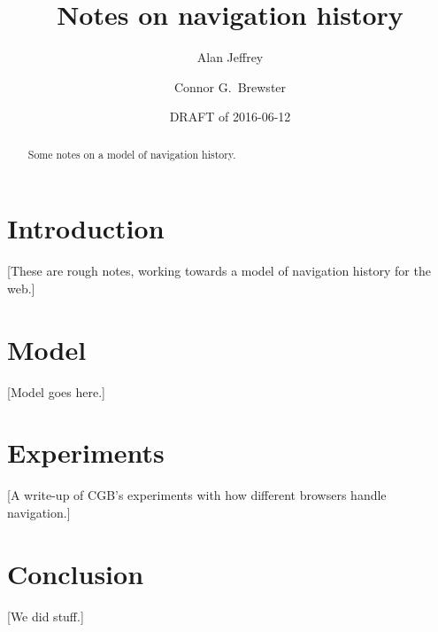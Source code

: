 \documentclass{article}
\title{Notes on navigation history}
\author{%
  Alan Jeffrey
  \and
  Connor G.~Brewster
}
\date{DRAFT of 2016-06-12}
\begin{document}
\maketitle

\begin{abstract}
  Some notes on a model of navigation history.
\end{abstract}

\section{Introduction}

[These are rough notes, working towards a model of navigation history for the web.]

\section{Model}

[Model goes here.]

\section{Experiments}

[A write-up of CGB's experiments with how different browsers handle navigation.]

\section{Conclusion}

[We did stuff.]
\end{document}
